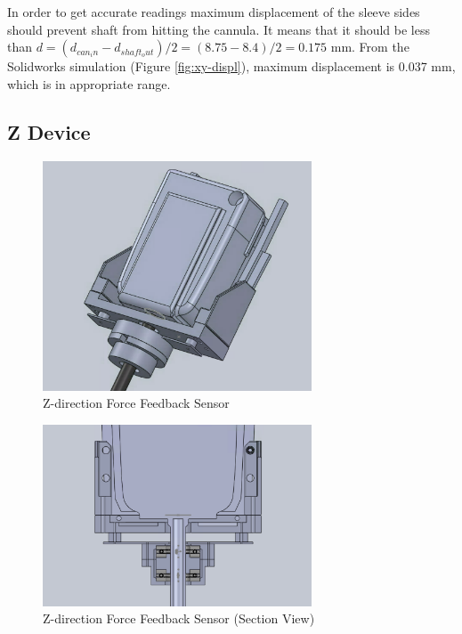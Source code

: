 In order to get accurate readings maximum displacement of the sleeve sides should prevent shaft from hitting the cannula. It means that it should be less than $d=(d_{can_in} - d_{shaft_out})/2 = (8.75 - 8.4)/2 = 0.175$ mm. From the Solidworks simulation (Figure \ref{fig:xy-displ}), maximum displacement is 0.037 mm, which is in appropriate range.

\subsection{Z Device}
\label{sec:zDir}

\begin{figure}[h]
	\begin{center}
		\includegraphics[width=80mm]{fig/methods/z_dir_design.png}
	\end{center}
	\vspace{-4mm}
	\caption[Z-direction Force Feedback Sensor]
	{Z-direction Force Feedback Sensor}
	\label{fig:Z-direction}
	\vspace{-2mm}
\end{figure}

\begin{figure}[h]
	\begin{center}
		\includegraphics[width=80mm]{fig/methods/z_dir_sec.png}
	\end{center}
	\vspace{-4mm}
	\caption[Z-direction Force Feedback Sensor (Section View)]
	{Z-direction Force Feedback Sensor (Section View)}
	\label{fig:Z-direction_sec}
	\vspace{-2mm}
\end{figure}


